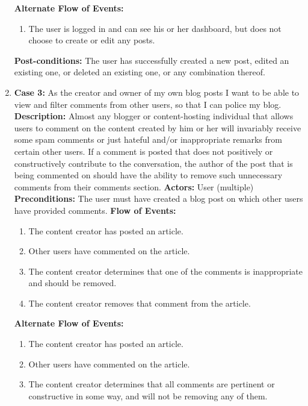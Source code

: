 \documentclass{article}
\begin{document}
\begin{enumerate}
\begin{enumerate}
    \end{enumerate} \newline
    \textbf{Alternate Flow of Events: }
    \begin{enumerate}
        \item The user is logged in and can see his or her dashboard, but does not choose to create or edit any posts.
    \end{enumerate} \newline
    \textbf{Post-conditions: } The user has successfully created a new post, edited an existing one, or deleted an existing one, or any combination thereof.
    \item  \textbf{Case 3: }As the creator and owner of my own blog posts I want to be able to view and filter comments from other users, so that I can police my blog. \newline
    \textbf{Description: }Almost any blogger or content-hosting individual that allows users to comment on the content created by him or her will invariably receive some spam comments or just hateful and/or inappropriate remarks from certain other users.  If a comment is posted that does not positively or constructively contribute to the conversation, the author of the post that is being commented on should have the ability to remove such unnecessary comments from their comments section. \newline
    \textbf{Actors: }User (multiple) \newline
    \textbf{Preconditions: }The user must have created a blog post on which other users have provided comments. \newline
    \textbf{Flow of Events: }
    \begin{enumerate}
        \item The content creator has posted an article.
        \item Other users have commented on the article.
        \item The content creator determines that one of the comments is inappropriate and should be removed.
        \item The content creator removes that comment from the article.
    \end{enumerate}
    \textbf{Alternate Flow of Events: }
    \begin{enumerate}
        \item The content creator has posted an article.
        \item Other users have commented on the article.
        \item The content creator determines that all comments are pertinent or constructive in some way, and will not be removing any of them.

\end{enumerate}
\end{enumerate}
\end{document}
